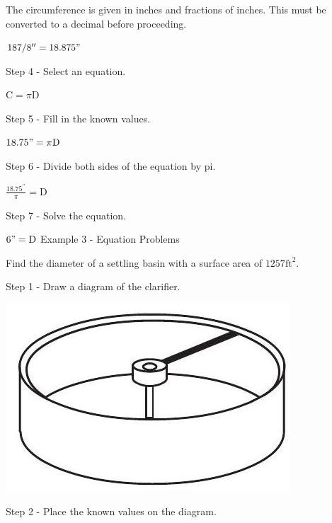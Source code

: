 \documentclass[10pt]{article}
\begin{document}
The circumference is given in inches and fractions of inches. This must be converted to a decimal before proceeding.

$187 / 8^{\prime \prime}=18.875 "$

Step 4 - Select an equation.

$\mathrm{C}=\pi \mathrm{D}$

Step 5 - Fill in the known values.

$18.75 "=\pi \mathrm{D}$

Step 6 - Divide both sides of the equation by pi.

$\frac{18.75^{\prime \prime}}{\pi}=\mathrm{D}$

Step 7 - Solve the equation.

$6 "=\mathrm{D}$ Example 3 - Equation Problems

Find the diameter of a settling basin with a surface area of $1257 \mathrm{ft}^{2}$.

Step 1 - Draw a diagram of the clarifier.

\includegraphics[max width=\textwidth]{2022_09_11_72dbedc910e6e984560cg-22}

Step 2 - Place the known values on the diagram.
\end{document}
